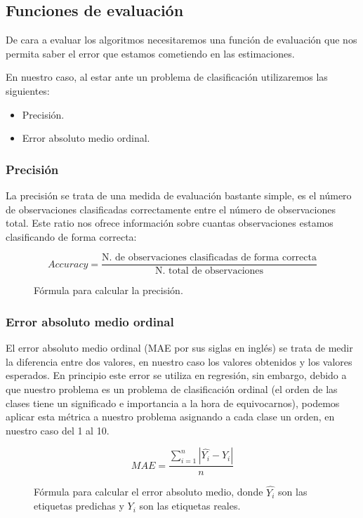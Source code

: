 \newpage

\subsection{Funciones de evaluación}

De cara a evaluar los algoritmos necesitaremos una función de evaluación que nos permita saber el error que estamos cometiendo en las estimaciones.

En nuestro caso, al estar ante un problema de clasificación utilizaremos las siguientes:

\begin{itemize}
	\item Precisión.
	\item Error absoluto medio ordinal.
\end{itemize}

\subsubsection{Precisión}

La precisión se trata de una medida de evaluación bastante simple, es el número de observaciones clasificadas correctamente entre el número de observaciones total. Este ratio nos ofrece información sobre cuantas observaciones estamos clasificando de forma correcta:

\begin{figure}[H]
	 \centering
	 $$ Accuracy = \frac{\text{N. de observaciones clasificadas de forma correcta}}{\text{N. total de observaciones}} $$
	 \caption{Fórmula para calcular la precisión.}
	\label{fig:Accuracy}
\end{figure}

\subsubsection{Error absoluto medio ordinal}

El error absoluto medio ordinal (MAE por sus siglas en inglés) se trata de medir la diferencia entre dos valores, en nuestro caso los valores obtenidos y los valores esperados. En principio este error se utiliza en regresión, sin embargo, debido a que nuestro problema es un problema de clasificación ordinal (el orden de las clases tiene un significado e importancia a la hora de equivocarnos), podemos aplicar esta métrica a nuestro problema asignando a cada clase un orden, en nuestro caso del 1 al 10.

\begin{figure}[H]
	 \centering
	 $$ MAE = \frac{\sum_{i = 1}^{n}|\hat{Y_i} - Y_i|}{n} $$
	 \caption{Fórmula para calcular el error absoluto medio, donde $\hat{Y_i}$ son las etiquetas predichas y $Y_i$ son las etiquetas reales.}
	\label{fig:MAE}
\end{figure}


\newpage
